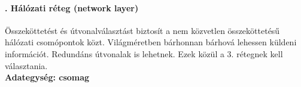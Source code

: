 \paragraph[Hálózati réteg]{. Hálózati réteg (network layer)}
Összeköttetést és útvonalválasztást biztosít a nem közvetlen összeköttetésű hálózati csomópontok közt. Világméretben bárhonnan bárhová lehessen küldeni információt. Redundáns útvonalak is lehetnek. Ezek közül a 3. rétegnek kell választania.\\
\textbf{Adategység: csomag}
